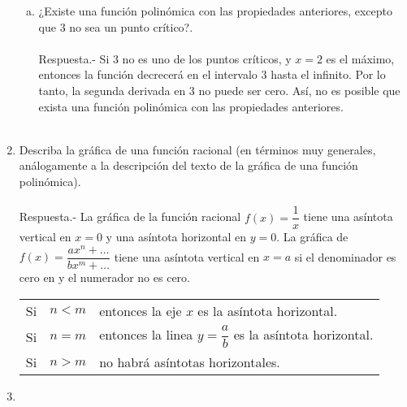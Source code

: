 \begin{enumerate}[\bfseries 1.]
\begin{enumerate}[(a)]
	    \item ¿Existe una función polinómica con las propiedades anteriores, excepto que $3$ no sea un punto crítico?.\\\\
		Respuesta.-\; Si $3$ no es uno de los puntos críticos, y $x=2$ es el máximo, entonces la función decrecerá en el intervalo $3$ hasta el infinito. Por lo tanto, la segunda derivada en $3$ no puede ser cero. Así, no es posible que exista una función polinómica con las propiedades anteriores.\\\\

	\end{enumerate}

    \item Describa la gráfica de una función racional (en términos muy generales, análogamente a la descripción del texto de la gráfica de una función polinómica).\\\\
	Respuesta.-\; La gráfica de la función racional $f\left( x \right) = \dfrac{1}{x}$ tiene una asíntota vertical en $x=0$ y una asíntota horizontal en $y=0$. La gráfica de $f(x)=\dfrac{ax^n+\ldots}{bx^m + \ldots}$ tiene una asíntota vertical en $x=a$ si el denominador es cero en y el numerador no es cero.
	\begin{center}
	\begin{tabular}{rcl}
	    Si & $n<m$ & entonces la eje $x$ es la asíntota horizontal.\\
	    Si & $n=m$ & entonces la linea $y=\dfrac{a}{b}$ es la asíntota horizontal.\\
	    Si & $n>m$ & no habrá asíntotas horizontales.
	\end{tabular}
	\end{center}
	\vspace{.5cm}

    \item 
	\begin{enumerate}[(a)]


\end{enumerate}
\end{enumerate}

